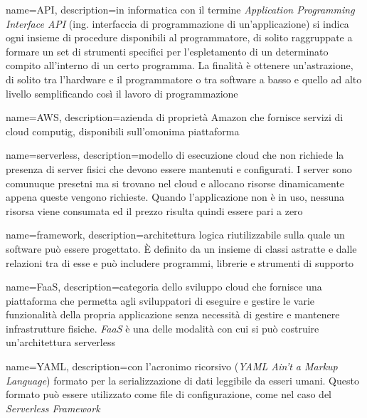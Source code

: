 
{
	name=API,
	description={in informatica con il termine \emph{Application Programming Interface API} (ing. interfaccia di programmazione di un'applicazione) si indica ogni insieme di procedure disponibili al programmatore, di solito raggruppate a formare un set di strumenti specifici per l'espletamento di un determinato compito all'interno di un certo programma. La finalità è ottenere un'astrazione, di solito tra l'hardware e il programmatore o tra software a basso e quello ad alto livello semplificando così il lavoro di programmazione}
}



{
	name=AWS,
	description={azienda di proprietà Amazon che fornisce servizi di cloud computig, disponibili sull'omonima piattaforma}
}

{
	name=serverless,
	description={modello di esecuzione cloud che non richiede la presenza di server fisici che devono essere mantenuti e configurati. I server sono comunuque presetni ma si trovano nel cloud e allocano risorse dinamicamente appena queste vengono richieste. Quando l'applicazione non è in uso, nessuna risorsa viene consumata ed il prezzo risulta quindi essere pari a zero}
}

{
	name=framework,
	description={architettura logica riutilizzabile sulla quale un software può essere progettato. È definito da un insieme di classi astratte e dalle relazioni tra di esse e può includere programmi, librerie e strumenti di supporto}
}

{
	name=FaaS,
	description={categoria dello sviluppo cloud che fornisce una piattaforma che permetta agli sviluppatori di eseguire e gestire le varie funzionalità della propria applicazione senza necessità di gestire e mantenere infrastrutture fisiche. \emph{FaaS} è una delle modalità con cui si può costruire un'architettura \gls{serverless}}
}

{
	name=YAML,
	description={con l’acronimo ricorsivo (\emph{YAML Ain’t a Markup Language}) formato per la serializzazione di dati leggibile da esseri umani. Questo formato può essere utilizzato come file di configurazione, come nel caso del \emph{Serverless Framework}}
}

